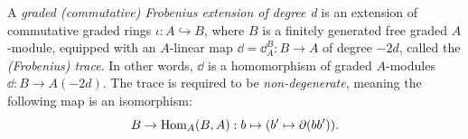 \begin{defn} A \emph{graded (commutative) Frobenius extension of degree d} is an extension of commutative graded rings $\iota :  A \hookrightarrow B$, where $B$ is a finitely generated free graded $A$-module, equipped with an
$A$-linear map $\dd = \dd_A^B : B \to A$ of degree $-2d$, called the \emph{(Frobenius) trace}. In other words, $\dd$ is a homomorphism of graded $A$-modules $\dd: B \rightarrow A(-2d)$. The trace is required to be \emph{non-degenerate}, meaning the following map is an isomorphism:
$$B \rightarrow \operatorname{Hom}_A(B,A): b \mapsto (b'\mapsto \partial(bb')).$$

\end{defn}
